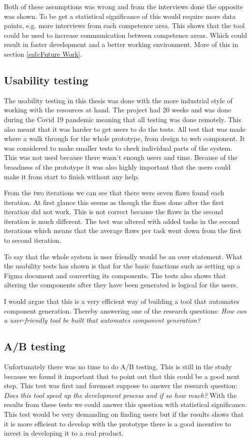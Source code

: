 Both of these assumptions was wrong and from the interviews done the opposite was shown. To be get a statistical significance of this would require more data points, e.g. more interviews from each competence area. This shows that the tool could be used to increase communication between competence areas. Which could result in faster development and a better working environment. More of this in section \ref{sub:Future Work}.

\subsection{Usability testing}%
\label{sub:Usability testing}
The usability testing in this thesis was done with the more industrial style of working with the resources at hand. The project had 20 weeks and was done during the Covid 19 pandemic meaning that all testing was done remotely. This also meant that it was harder to get users to do the tests. All test that was made where a walk through for the whole prototype, from design to web component. It was considered to make smaller tests to check individual parts of the system. This was not used because there wasn't enough users and time. Because of the broadness of the prototype it was also highly important that the users could make it from start to finish without any help. 

From the two iterations we can see that there were seven flaws found each iteration. At first glance this seems as though the fixes done after the first iteration did not work. This is not correct because the flaws in the second iteration is much different. The test was altered with added tasks in the second iterations which means that the average flaws per task went down from the first to second iteration. 

To say that the whole system is user friendly would be an over statement. What the usability tests has shown is that for the basic functions such as setting up a Figma document and converting its components. The tests also shows that altering the components after they have been generated is logical for the users. 

I would argue that this is a very efficient way of building a tool that automates component generation. Thereby answering one of the research questions: \textit{How can a user-friendly tool be built that automates component generation?}


\subsection{A/B testing}%
\label{sub:A/B testing}
Unfortunately there was no time to do A/B testing. This is still in the study because we found it important that to point out that this could be a good next step. This test was first and foremost suppose to answer the  research question: \textit{Does this tool speed up the development process and if so how much?} With the results from these tests we could answer this question with statistical significance. This test would be very demanding on finding users but if the results shows that it is more efficient to develop with the prototype there is a good incentive to invest in developing it to a real product. 

